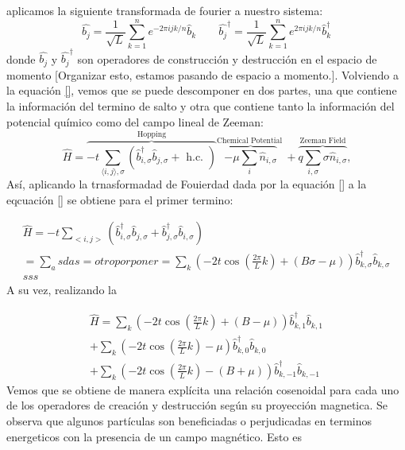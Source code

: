 aplicamos la siguiente transformada de fourier a nuestro sistema:
\begin{equation}
    \hat{b_j} = \frac{1}{\sqrt{L}} \sum_{k=1}^{n} e^{-2\pi i jk/n}  \hat{b}_{k} \quad \quad \hat{b_j}^{\dagger} = \frac{1}{\sqrt{L}} \sum_{k=1}^{n} e^{2\pi i jk/n} \hat{b}_{k}^{\dagger}
\end{equation}
donde $\hat{b_j}$ y $\hat{b_j}^{\dagger}$ son operadores de construcción y destrucción en el espacio de momento [Organizar esto, estamos pasando de espacio a momento.]. Volviendo a la equación \eqref{}, vemos que se puede descomponer en dos partes, una que contiene la información del termino de salto y otra que contiene tanto la información del potencial químico como del campo lineal de Zeeman:
\begin{equation}
    \hat{H}=\overbrace{-t \sum_{\langle i, j\rangle, \sigma}\left(\hat{b}_{i, \sigma}^{\dagger} \hat{b}_{j, \sigma}+\text { h.c. }\right)}^{\text {Hopping}}  \overbrace{-\mu \sum_i \hat{n}_{i, \sigma}}^{\text {Chemical Potential }}+\overbrace{q \sum_{i, \sigma} \sigma \hat{n}_{i, \sigma}}^{\text {Zeeman Field}} \text{,}
\end{equation}
Así, aplicando la trnasformadad de Fouierdad dada por la equación \eqref{} a la eqcuación \eqref{} se obtiene para el primer termino:



\begin{align}
     \hat{H} = -t \sum_{<i,j>} \left( \hat{b}_{i,\sigma}^{\dagger}\hat{b}_{j,\sigma}^{} + \hat{b}_{j,\sigma}^{\dagger} \hat{b}_{i,\sigma}^{} \right) \\
     = \sum_asdas = otro por poner = \sum_{k} \left( -2t \cos{(\frac{2\pi}{L} k)} + (B \sigma - \mu) \right) \hat{b}_{k,\sigma}^{\dagger} \hat{b}_{k,\sigma}^{}  \\
      sss
\end{align}
A su vez, realizando la 


 \begin{align}
    \hat{H} = \sum_{k} \left( -2t \cos{(\frac{2\pi}{L} k)} + (B - \mu) \right) \hat{b}_{k,1}^{\dagger} \hat{b}_{k,1}^{} \nonumber \\
    +\sum_{k} \left( -2t \cos{(\frac{2\pi}{L} k)}  - \mu \right) \hat{b}_{k,0}^{\dagger} \hat{b}_{k,0}^{} \\
    + \sum_{k} \left( -2t \cos{(\frac{2\pi}{L} k)} - (B + \mu) \right) \hat{b}_{k,-1}^{\dagger} \hat{b}_{k,-1}^{}   \nonumber
 \end{align}
Vemos que se obtiene de manera explícita una relación cosenoidal para cada uno de los operadores de creación y destrucción según su proyección magnetica. Se observa que algunos partículas son beneficiadas o perjudicadas en terminos energeticos con la presencia de un campo magnético. Esto es



